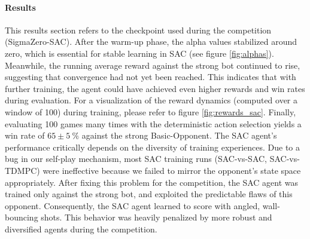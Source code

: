 \paragraph{Results}
This results section refers to the checkpoint used during the competition (SigmaZero-SAC). After the warm-up phase, the alpha values stabilized around zero, which is essential for stable learning in SAC (see figure \ref{fig:alphas}). Meanwhile, the running average reward against the strong bot continued to rise, suggesting that convergence had not yet been reached. This indicates that with further training, the agent could have achieved even higher rewards and win rates during evaluation. For a visualization of the reward dynamics (computed over a window of 100) during training, please refer to figure \ref{fig:rewards_sac}. Finally, evaluating 100 games many times with the deterministic action selection yields a win rate of $65\pm5 \ \%$ against the strong Basic-Opponent. The SAC agent's performance critically depends on the diversity of training experiences. Due to a bug in our self-play mechanism, most SAC training runs (SAC-vs-SAC, SAC-vs-TDMPC) were ineffective because we failed to mirror the opponent’s state space appropriately. After fixing this problem for the competition, the SAC agent was trained only against the strong bot, and exploited the predictable flaws of this opponent. Consequently, the SAC agent learned to score with angled, wall-bouncing shots. This behavior was heavily penalized by more robust and diversified agents during the competition.
